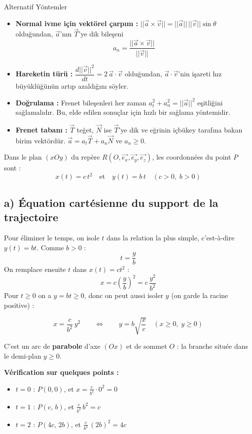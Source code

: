 \documentclass[11pt,a4paper]{article}
\begin{document}
\begin{theoriebox}{Alternatif Yöntemler}
\begin{itemize}
    \item \textbf{Normal ivme için vektörel çarpım :} $||\vec{a}\times\vec{v}|| = ||\vec{a}||\,||\vec{v}||\sin\theta$ olduğundan, $\vec{a}$'nın $\vec{T}$'ye dik bileşeni
    $$ a_n = \frac{||\vec{a}\times\vec{v}||}{||\vec{v}||} $$
    \item \textbf{Hareketin türü :} $\dfrac{d||\vec{v}||^2}{dt} = 2\,\vec{a}\cdot\vec{v}$ olduğundan, $\vec{a}\cdot\vec{v}$'nin işareti hız büyüklüğünün artıp azaldığını söyler.
    \item \textbf{Doğrulama :} Frenet bileşenleri her zaman $a_t^2 + a_n^2 = ||\vec{a}||^2$ eşitliğini sağlamalıdır. Bu, elde edilen sonuçlar için hızlı bir sağlama yöntemidir.
    \item \textbf{Frenet tabanı :} $\vec{T}$ teğet, $\vec{N}$ ise $\vec{T}$'ye dik ve eğrinin içbükey tarafına bakan birim vektördür. $\vec{a}=a_t\vec{T}+a_n\vec{N}$ ve $a_n\ge 0$.
\end{itemize}
\end{theoriebox}

Dans le plan $(xOy)$ du repère $R(O, \vec{e_x}, \vec{e_y}, \vec{e_z})$, les coordonnées du point $P$ sont :
$$ x(t) = c\,t^2 \quad \text{et} \quad y(t) = b\,t \quad (c>0,\; b>0) $$

\subsection*{a) Équation cartésienne du support de la trajectoire}
Pour éliminer le temps, on isole $t$ dans la relation la plus simple, c'est-à-dire $y(t)=bt$. Comme $b>0$ :
$$ t = \dfrac{y}{b} $$
On remplace ensuite $t$ dans $x(t)=ct^2$ :
$$ x = c\left(\frac{y}{b}\right)^2 = c\,\frac{y^2}{b^2} $$
Pour $t \ge 0$ on a $y = bt \ge 0$, donc on peut aussi isoler $y$ (on garde la racine positive) :
\begin{sonucbox}
$$ x = \frac{c}{b^2}\,y^2 \qquad \Longleftrightarrow \qquad y = b\sqrt{\frac{x}{c}} \quad (x \ge 0,\; y\ge 0) $$
\end{sonucbox}
C'est un arc de \textbf{parabole} d'axe $(Ox)$ et de sommet $O$ : la branche située dans le demi-plan $y \ge 0$.

\textbf{Vérification sur quelques points :}
\begin{itemize}
    \item $t=0$ : $P(0,0)$, et $x=\frac{c}{b^2}\cdot 0^2 = 0$ \checkmark
    \item $t=1$ : $P(c,\,b)$, et $\frac{c}{b^2}\,b^2 = c$ \checkmark
    \item $t=2$ : $P(4c,\,2b)$, et $\frac{c}{b^2}\,(2b)^2 = 4c$ \checkmark
\end{itemize}
\end{document}
